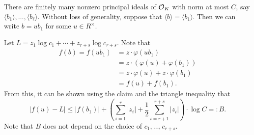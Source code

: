 \begin{pf}
    There are finitely many nonzero principal ideals of ${\cal O}_K$ 
    with norm at most $C$, say $\langle b_1 \rangle, \dots, \langle b_\ell \rangle$. 
    Without loss of generality, suppose that $\langle b \rangle = \langle b_1 \rangle$. 
    Then we can write $b = ub_1$ for some $u \in R^\times$. 
    
    Let $L = z_1 \log c_1 + \cdots + z_{r+s} \log c_{r+s}$. Note that 
    \begin{align*}
        f(b) = f(ub_1) &= z \cdot \varphi(ub_1) \\ 
        &= z \cdot (\varphi(u) + \varphi(b_1)) \\ 
        &= z \cdot \varphi(u) + z \cdot \varphi(b_1) \\ 
        &= f(u) + f(b_1). 
    \end{align*}
    From this, it can be shown using the claim and the triangle inequality that 
    \[ |f(u) - L| \leq |f(b_1)| + \left( \sum_{i=1}^r |z_i| + \frac12 \sum_{i=r+1}^{r+s} |z_i| \right) 
    \cdot \log C =: B. \] 
    Note that $B$ does not depend on the choice of $c_1, \dots, c_{r+s}$.
\end{pf}\vspace{-0.25cm}    
